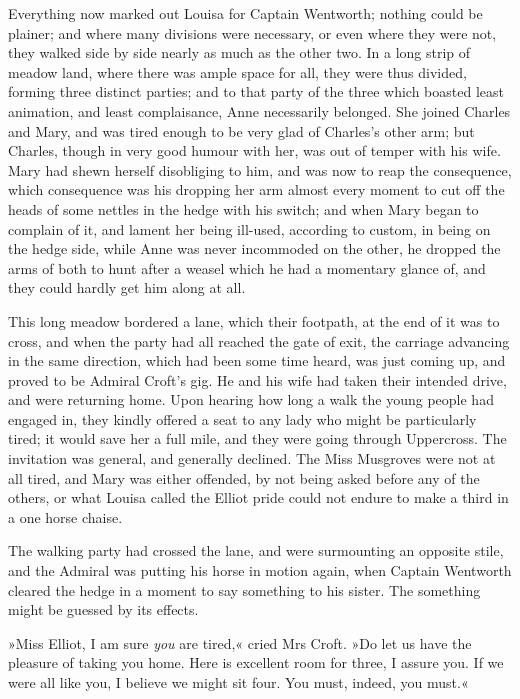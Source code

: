 Everything now marked out Louisa for Captain Wentworth; nothing could be plainer; and where many divisions were necessary, or even where they were not, they walked side by side nearly as much as the other two. In a long strip of meadow land, where there was ample space for all, they were thus divided, forming three distinct parties; and to that party of the three which boasted least animation, and least complaisance, Anne necessarily belonged. She joined Charles and Mary, and was tired enough to be very glad of Charles's other arm; but Charles, though in very good humour with her, was out of temper with his wife. Mary had shewn herself disobliging to him, and was now to reap the consequence, which consequence was his dropping her arm almost every moment to cut off the heads of some nettles in the hedge with his switch; and when Mary began to complain of it, and lament her being ill-used, according to custom, in being on the hedge side, while Anne was never incommoded on the other, he dropped the arms of both to hunt after a weasel which he had a momentary glance of, and they could hardly get him along at all.

This long meadow bordered a lane, which their footpath, at the end of it was to cross, and when the party had all reached the gate of exit, the carriage advancing in the same direction, which had been some time heard, was just coming up, and proved to be Admiral Croft's gig. He and his wife had taken their intended drive, and were returning home. Upon hearing how long a walk the young people had engaged in, they kindly offered a seat to any lady who might be particularly tired; it would save her a full mile, and they were going through Uppercross. The invitation was general, and generally declined. The Miss Musgroves were not at all tired, and Mary was either offended, by not being asked before any of the others, or what Louisa called the Elliot pride could not endure to make a third in a one horse chaise.

The walking party had crossed the lane, and were surmounting an opposite stile, and the Admiral was putting his horse in motion again, when Captain Wentworth cleared the hedge in a moment to say something to his sister. The something might be guessed by its effects.

»Miss Elliot, I am sure \textit{you} are tired,« cried Mrs Croft. »Do let us have the pleasure of taking you home. Here is excellent room for three, I assure you. If we were all like you, I believe we might sit four. You must, indeed, you must.«

